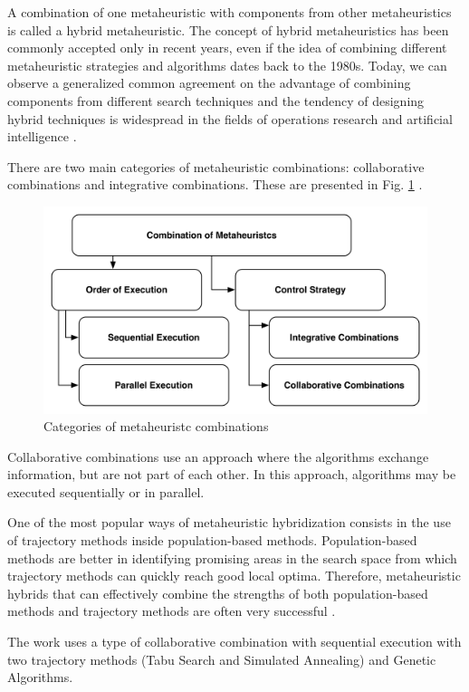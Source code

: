 A combination of one metaheuristic with components from other metaheuristics is called a hybrid metaheuristic. The concept of hybrid metaheuristics has been commonly accepted only in recent years, even if the idea of combining different metaheuristic strategies and algorithms dates back to the 1980s. Today, we can observe a generalized common agreement on the advantage of combining components from different search techniques and the tendency of designing hybrid techniques is widespread in the fields of operations research and artificial intelligence \cite{raidl2010metaheuristic}. 


There are two main categories of metaheuristic combinations: collaborative combinations and integrative combinations. These are presented in Fig. \ref{fig:metaheuristc} \cite{Raidl2006}.

\begin{figure}[h]
\centering
\includegraphics[width=1\textwidth]{./images/metaheuristc2.png}
\caption{Categories of metaheuristc combinations \cite{Puchinger2005} }
\label{fig:metaheuristc}
\end{figure}

Collaborative combinations use an approach where the algorithms exchange information, but are not part of each other. In this approach, algorithms may be executed sequentially or in parallel. 

One of the most popular ways of metaheuristic hybridization consists in the use of trajectory methods inside population-based methods. Population-based methods are better in identifying promising areas in the search space from which trajectory methods can quickly reach good local optima. Therefore, metaheuristic hybrids that can effectively combine the strengths of both population-based methods and trajectory methods are often very successful \cite{raidl2010metaheuristic}.


The work uses a type of collaborative combination with sequential execution with two trajectory methods (Tabu Search and Simulated Annealing) and Genetic Algorithms.



